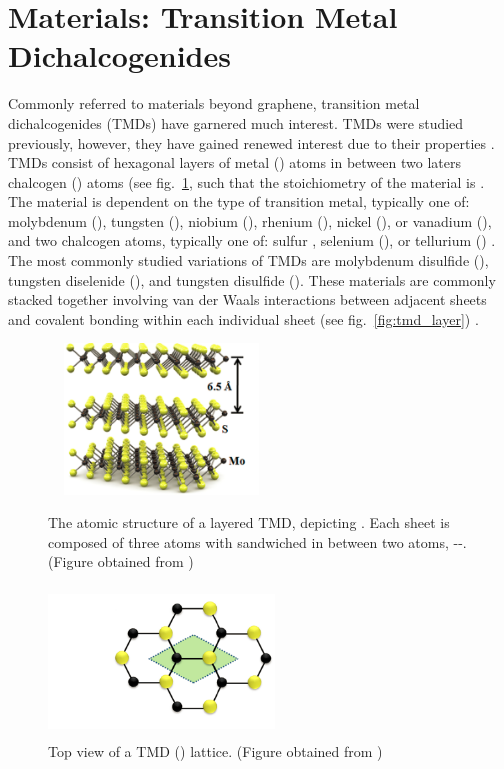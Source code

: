 \section{\Td Materials: Transition Metal Dichalcogenides}\label{sec:tmds}
Commonly referred to \td materials beyond graphene, transition metal dichalcogenides (TMDs) have garnered much interest. TMDs were studied previously, however, they have gained renewed interest due to their properties \cite{Frindt_Royal1963,Fivaz_PhysRev1967,Mattheiss_PhysRevB1973,Wilson_AdvPhys1969}. TMDs consist of hexagonal layers of metal () atoms in between two laters chalcogen () atoms (see fig.~\ref{fig:tmd_hexagonal}, such that the stoichiometry of the material is  \cite{Xu_ChemRev2013}. The material is dependent on the type of transition metal, typically one of: molybdenum (), tungsten (), niobium (), rhenium (), nickel (), or vanadium (), and two chalcogen atoms, typically one of: sulfur , selenium (), or tellurium () \cite{Wilson_AdvPhys1969,Wells_Oxford1984}. The most commonly studied variations of TMDs are molybdenum disulfide (), tungsten diselenide (), and tungsten disulfide (). These materials are commonly stacked together involving van der Waals interactions between adjacent sheets and covalent bonding within each individual sheet (see fig.~\ref{fig:tmd_layer}) \cite{Xu_ChemRev2013}.
\begin{figure}[ht]
	\centering
	\begin{minipage}[b]{0.45\linewidth}
		\includegraphics[height=4cm,width=6cm]{figs/tmdlayered}
		\caption[Layered TMD diagram]{The atomic structure of a layered TMD, depicting . Each sheet is composed of three atoms with  sandwiched in between two  atoms, --. (Figure obtained from \cite{Kis_NatureNano2011})}
		\label{fig:tmd_layer}
	\end{minipage}
	\qquad
	\begin{minipage}[b]{0.45\linewidth}
		\includegraphics[height=4cm,width=6cm]{figs/tmdhexagonal}
		\caption[Hexagonal lattice of TMD]{Top view of a TMD () lattice. (Figure obtained from \cite{Kis_NatureNano2011})}
		\label{fig:tmd_hexagonal}
	\end{minipage}
\end{figure}
